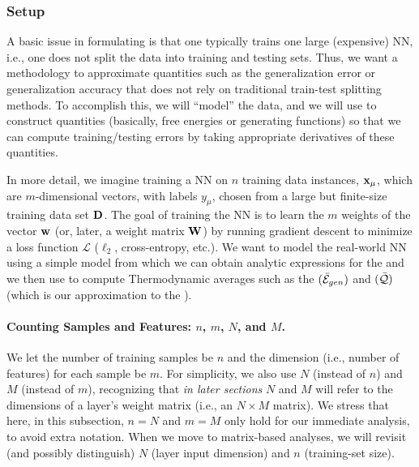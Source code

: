 \subsubsection{Setup}
\label{sxn:mathP_setup}



A basic issue in formulating \SETOL is that one typically trains one large (expensive) NN, i.e., one does not split the data into training and testing sets.
Thus, we want a methodology to approximate quantities such as the generalization error or generalization accuracy that does not rely on traditional train-test splitting methods.
To accomplish this, we will ``model'' the data, and we will use \STATMECH to construct quantities (basically, free energies or generating functions) so that we can compute training/testing errors by taking appropriate derivatives of these quantities.

In more detail, we imagine training a NN on $n$ training data instances, ${\mathbf{x}}_{\mu}$, which are $m$-dimensional vectors,
with labels $y_{\mu}$, chosen from a large but finite-size training data set $\mathbf{D}$.
The goal of training the NN is to learn the $m$ weights of the vector ${\mathbf{w}}$ (or, later, a weight matrix ${\mathbf{W}}$) by running gradient descent to minimize
a loss function $\mathcal{L}$ ($\ell_2$, cross-entropy, etc.). 
We want to model the real-world NN using a simple model from which we can obtain 
analytic expressions for the \emph{\FreeEnergy} and \emph{\GeneratingFunction} we then use to compute
Thermodynamic averages such as the \emph{\AverageGeneralizationError} $(\bar{\mathcal{E}}_{gen})$ and
\emph{\ModelQuality} $(\bar{\mathcal{Q}})$ (which is our approximation to the \emph{\AverageGeneralizationAccuracy}).

\paragraph{Counting Samples and Features: $n$, $m$, $N$, and $M$.}
We let the number of training samples be $n$ and the dimension 
(i.e., number of features) for each sample be $m$.  For simplicity, 
we also use $N$ (instead of $n$) and $M$ (instead of $m$), recognizing that 
\emph{in later sections} $N$ and $M$ will refer to the dimensions 
of a layer’s weight matrix (i.e., an $N \times M$ matrix). 
We stress that here, in this subsection,  $n = N$ and $m = M$ only hold for our immediate analysis, 
to avoid extra notation. When we move to matrix-based analyses, 
we will revisit (and possibly distinguish) $N$ (layer input dimension) and $n$ (training-set size).

